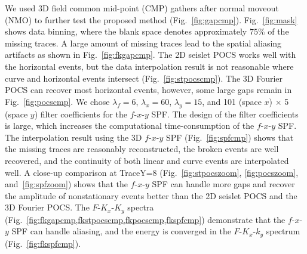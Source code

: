 We used 3D field common mid-point (CMP) gathers after normal moveout
(NMO) to further test the proposed method (Fig.~\ref{fig:gapcmp}).
Fig.~\ref{fig:mask} shows data binning, where the blank space denotes
approximately $75\%$ of the missing traces. A large amount of missing
traces lead to the spatial aliasing artifacts as shown in
Fig.~\ref{fig:fkgapcmp}.  The 2D seislet POCS works well with the
horizontal events, but the data interpolation result is not reasonable
where curve and horizontal events intersect
(Fig.~\ref{fig:stpocscmp}).  The 3D Fourier POCS can recover most
horizontal events, however, some large gaps remain in
Fig.~\ref{fig:pocscmp}.  We chose $\lambda_{f}=6$, $\lambda_{x}=60$,
$\lambda_{y}=15$, and 101 (space $x$) $\times$ 5 (space $y$) filter
coefficients for the $f$-$x$-$y$ SPF.  The design of the filter
coefficients is large, which increases the computational
time-consumption of the $f$-$x$-$y$ SPF.  The interpolation result
using the 3D $f$-$x$-$y$ SPF (Fig.~\ref{fig:spfcmp}) shows that the
missing traces are reasonably reconstructed, the broken events are
well recovered, and the continuity of both linear and curve events are
interpolated well. A close-up comparison at TraceY=8
(Fig.~\ref{fig:stpocszoom}, \ref{fig:pocszoom}, and~\ref{fig:spfzoom})
shows that the $f$-$x$-$y$ SPF can handle more gaps and recover the
amplitude of nonstationary events better than the 2D seislet POCS and
the 3D Fourier POCS.  The $F$-$K_{x}$-$K_{y}$ spectra
(Fig.~\ref{fig:fkgapcmp,fkstpocscmp,fkpocscmp,fkspfcmp}) demonstrate
that the $f$-$x$-$y$ SPF can handle aliasing, and the energy is
converged in the $F$-$K_{x}$-$k_{y}$ spectrum
(Fig.~\ref{fig:fkspfcmp}).

